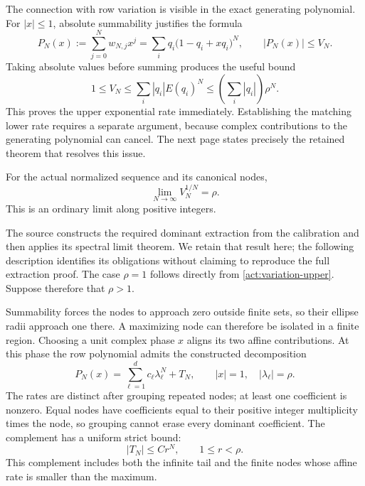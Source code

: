 The connection with row variation is visible in the exact generating
polynomial. For $|x|\le1$, absolute summability justifies the formula
\begin{equation}\label{act:row-generating}
 P_N(x):=\sum_{j=0}^Nw_{N,j}x^j
       =\sum_iq_i\bigl(1-q_i+xq_i\bigr)^N,
 \qquad |P_N(x)|\le V_N.
\end{equation}
Taking absolute values before summing produces the useful bound
\begin{equation}\label{act:variation-upper}
 1\le V_N\le\sum_i|q_i|E(q_i)^N
                  \le\left(\sum_i|q_i|\right)\rho^N.
\end{equation}
This proves the upper exponential rate immediately. Establishing the
matching lower rate requires a separate argument, because complex
contributions to the generating polynomial can cancel. The next page
states precisely the retained theorem that resolves this issue.

\label{act:root-limit}
\begin{theorem}\label{act:spectral-limit}
For the actual normalized sequence and its canonical nodes,
\begin{equation}\label{act:ordinary-root-limit}
 \lim_{N\to\infty}V_N^{1/N}=\rho.
\end{equation}
This is an ordinary limit along positive integers.
\end{theorem}
The source constructs the required dominant extraction from the
calibration and then applies its spectral limit theorem. We retain that
result here; the following description identifies its obligations without
claiming to reproduce the full extraction proof. The case $\rho=1$ follows
directly from \eqref{act:variation-upper}. Suppose therefore that $\rho>1$.

Summability forces the nodes to approach zero outside finite sets, so
their ellipse radii approach one there. A maximizing node can therefore
be isolated in a finite region. Choosing a unit complex phase $x$ aligns
its two affine contributions. At this phase the row polynomial admits
the constructed decomposition
\begin{equation}\label{act:dominant-decomposition}
 P_N(x)=\sum_{\ell=1}^{d}c_\ell\lambda_\ell^N+T_N,
 \qquad |x|=1,\quad |\lambda_\ell|=\rho.
\end{equation}
The rates are distinct after grouping repeated nodes; at least one
coefficient is nonzero. Equal nodes have coefficients equal to their
positive integer multiplicity times the node, so grouping cannot erase
every dominant coefficient. The complement has a uniform strict bound:
\begin{equation}\label{act:tail-bound}
 |T_N|\le C r^N,\qquad 1\le r<\rho.
\end{equation}
This complement includes both the infinite tail and the finite nodes
whose affine rate is smaller than the maximum.

